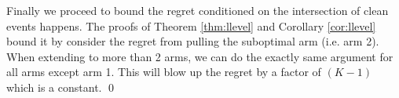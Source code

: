 Finally we proceed to bound the regret conditioned on the intersection of clean events happens. The proofs of Theorem \ref{thm:llevel} and Corollary \ref{cor:llevel} bound it by consider the regret from pulling the suboptimal arm (i.e. arm 2). When extending to more than 2 arms, we can do the exactly same argument for all arms except arm 1. This will blow up the regret by a factor of $(K-1)$ which is a constant.
\qed

 
